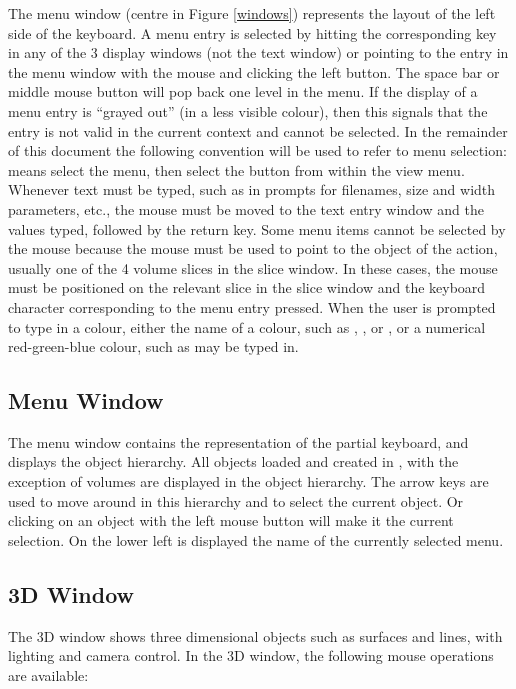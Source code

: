 The menu window (centre in Figure \ref{windows}) represents the layout
of the left side of the keyboard.  A menu entry is selected by hitting the
corresponding key in any of the 3 display windows (not the text window)
or pointing to the entry
in the menu window with the mouse and clicking the left button.
The space bar or middle mouse
button will pop back one level in the menu.  If the display of a menu
entry is ``grayed out'' (in a less visible colour), then this signals that the
entry is not valid in the current context and cannot be selected.  In the
remainder of this document
the following convention will be used to refer to menu selection:
 means select the  menu, then
select the  button
from within the view menu.  Whenever text must be typed, such as in prompts
for filenames, size and width parameters, etc., the mouse must be moved to the
text entry window and the values typed, followed by the return key.
Some menu items cannot be selected by the mouse because the mouse must be
used to point to the object of the action, usually one of the 4 volume slices
in the slice window.
In these cases, the mouse must be positioned on the relevant slice in
the slice window and the
keyboard character corresponding to the menu entry pressed.
When the user is prompted to type in a colour, either the name of a colour,
such as , , or , or a numerical
red-green-blue colour,
such as \mbox{} may be typed in.

\subsection{Menu Window}

The menu window contains the representation of the partial keyboard, and
displays the object hierarchy.  All objects loaded and created in \display,
with the exception of volumes are displayed in the object hierarchy.  The
arrow keys are used to move around in this hierarchy and to select the
current object.  Or clicking on an object with the left mouse button
will make it the current selection.  On the lower left is displayed the
name of the currently selected menu.

\subsection{3D Window}

The 3D window shows three dimensional objects such as surfaces and
lines, with lighting and camera control.  In the 3D window, the following
mouse operations are available:

